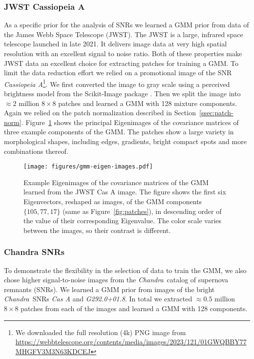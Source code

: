 \documentclass[twocolumn, lineno]{aastex631}
\newcommand{\chandra}{\textit{Chandra}~}
\begin{document}
    \subsubsection{JWST Cassiopeia A}
    As a specific prior for the analysis of SNRs we learned a GMM prior from data of the James Webb Space Telescope (JWST). The JWST is a large, infrared space telescope launched in late 2021. It delivers image data at very high spatial resolution with an excellent signal to noise ratio. Both of these properties make JWST data an excellent choice for extracting patches for training a GMM. To limit the data reduction effort we relied on a promotional image of the SNR \textit{Cassiopeia A}\footnote{We downloaded the full resolution (4k)  PNG image from \url{https://webbtelescope.org/contents/media/images/2023/121/01GWQBBY77MHGFV3M3N63KDCEJ}}. We first converted the image to gray scale using a perceived brightness model from the Scikit-Image package \citep{scikit-image}. Then we split the image into $\approx 2$ million $8\times 8$ patches and learned a GMM with 128 mixture components. Again we relied on the patch normalization described in Section~\ref{ssec:patch-norm}. Figure~\ref{fig:gmm-eigen-images} shows the principal Eigenimages of the covariance matrices of three example components of the GMM. The patches show a large variety in morphological shapes, including edges, gradients, bright compact spots and more combinations thereof.

    \begin{figure}
        \begin{centering}
            \texttt{[image: figures/gmm-eigen-images.pdf]}
            \caption{
                Example Eigenimages of the covariance matrices of the GMM learned from the JWST Cas A image. The figure shows the first six Eigenvectors, reshaped as images, of the GMM components $\{105, 77, 17\}$ (same as Figure~\ref{fig:patches}), in descending order of the value of their corresponding Eigenvalue. The color scale varies between the images, so their contrast is different. 
            }
            \label{fig:gmm-eigen-images}
        \end{centering}
    \end{figure}

    \subsubsection{Chandra SNRs}
    \label{sssec:chandra-snrs}
    To demonstrate the flexibility in the selection of data to train the GMM, we also chose higher signal-to-noise images from the \chandra catalog of supernova remnants (SNRs). We learned a GMM prior from images of the bright \chandra SNRs \textit{Cas A} and \textit{G292.0+01.8}. In total we extracted $\approx 0.5$ million $8\times 8$ patches from each of the images and learned a GMM with 128 components.
\end{document}
